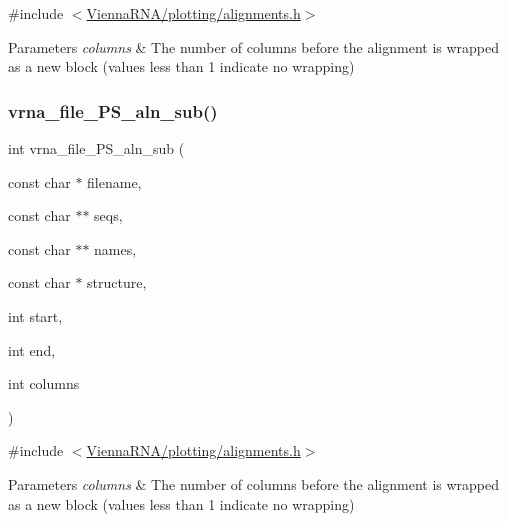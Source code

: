 {\ttfamily \#include $<$\hyperlink{plotting_2alignments_8h}{Vienna\+R\+N\+A/plotting/alignments.\+h}$>$}


\begin{DoxyParams}{Parameters}
{\em columns} & The number of columns before the alignment is wrapped as a new block (values less than 1 indicate no wrapping) \\
\hline
\end{DoxyParams}
\mbox{\label{group__plotting__utils_ga2881c9b855baff948f92b93262df9ff6}} 
\subsubsection{\texorpdfstring{vrna\+\_\+file\+\_\+\+P\+S\+\_\+aln\+\_\+sub()}{vrna\_file\_PS\_aln\_sub()}}
{\footnotesize\ttfamily int vrna\+\_\+file\+\_\+\+P\+S\+\_\+aln\+\_\+sub (\begin{DoxyParamCaption}\item[{const char $\ast$}]{filename,  }\item[{const char $\ast$$\ast$}]{seqs,  }\item[{const char $\ast$$\ast$}]{names,  }\item[{const char $\ast$}]{structure,  }\item[{int}]{start,  }\item[{int}]{end,  }\item[{int}]{columns }\end{DoxyParamCaption})}



{\ttfamily \#include $<$\hyperlink{plotting_2alignments_8h}{Vienna\+R\+N\+A/plotting/alignments.\+h}$>$}


\begin{DoxyParams}{Parameters}
{\em columns} & The number of columns before the alignment is wrapped as a new block (values less than 1 indicate no wrapping) \\
\hline
\end{DoxyParams}
\mbox{\label{group__plotting__utils_gaab48d4dac655d688abe921389ac2847c}} 
